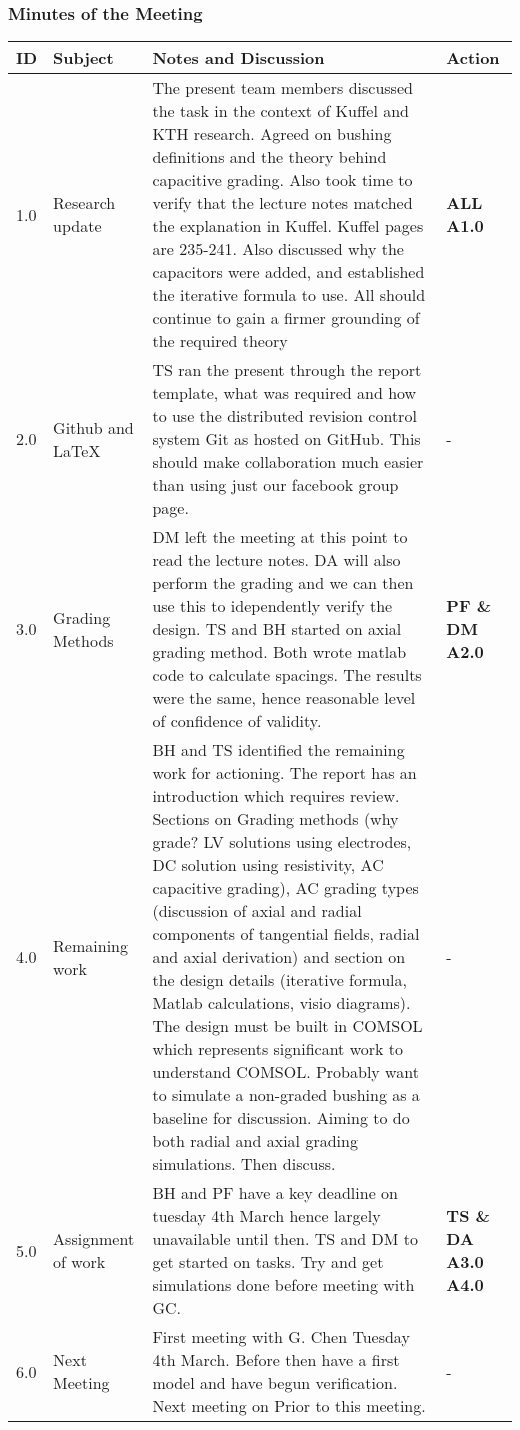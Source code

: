 \subsubsection{Minutes of the Meeting}
\begin{center}
\begin{longtable}{| p{} |>{\raggedright\arraybackslash}p{} | p{} |>{\raggedright\arraybackslash}p{}|} \hline
\textbf{ID} & \textbf{Subject} & \textbf{Notes and Discussion} & \textbf{Action} \\ \hline
\endhead
1.0	&	Research update	&	The present team members discussed the task in the context of Kuffel and KTH research. Agreed on bushing definitions and the theory behind capacitive grading. Also took time to verify that the lecture notes matched the explanation in Kuffel. Kuffel pages are 235-241. Also discussed why the capacitors were added, and established the iterative formula to use. All should continue to gain a firmer grounding of the required theory & \textbf{ALL A1.0}  	 \\ \hline
2.0	&	Github and \LaTeX	&	TS ran the present through the report template, what was required and how to use the distributed revision control system Git as hosted on GitHub. This should make collaboration much easier than using just our facebook group page. 	& -	 \\ \hline
3.0 	& 	Grading Methods &	DM left the meeting at this point to read the lecture notes. DA will also perform the grading and we can then use this to idependently verify the design. TS and BH started on axial grading method. Both wrote matlab code to calculate spacings. The results were the same, hence reasonable level of confidence of validity. & \textbf{PF \& DM A2.0} \\ \hline
4.0	&	Remaining work	& BH and TS identified the remaining work for actioning. The report has an introduction which requires review. Sections on Grading methods (why grade? LV solutions using electrodes, DC solution using resistivity, AC capacitive grading), AC grading types (discussion of axial and radial components of tangential fields, radial and axial derivation) and section on the design details (iterative formula, Matlab calculations, visio diagrams). The design must be built in COMSOL which represents significant work to understand COMSOL. Probably want to simulate a non-graded bushing as a baseline for discussion. Aiming to do both radial and axial grading simulations. Then discuss. & - \\ \hline
5.0	&	Assignment of work	& BH and PF have a key deadline on tuesday 4th March hence largely unavailable until then. TS and DM to get started on tasks. Try and get simulations done before meeting with GC. & \textbf{TS \& DA A3.0 A4.0} \\ \hline
6.0	&	Next Meeting	&	First meeting with G. Chen  Tuesday 4th March. Before then have a first model and have begun verification. Next meeting on Prior to this meeting. & - \\ \hline

\end{longtable}
\end{center}

